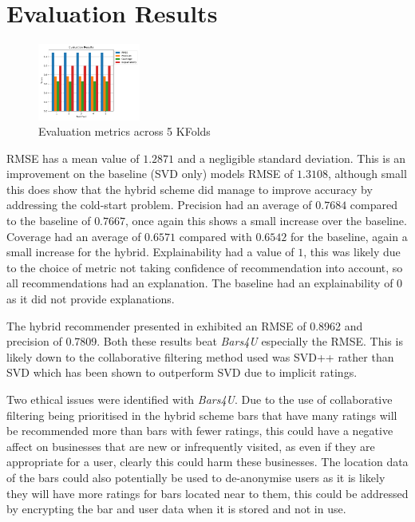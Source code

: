 \documentclass[conference]{IEEEtran}
\begin{document}
\section{Evaluation Results}
\begin{figure}[h]
    \centering
    \includegraphics[width=0.3\textwidth]{result_graph}
    \caption{Evaluation metrics across 5 KFolds}
    \label{fig:res}
\end{figure}
RMSE has a mean value of $1.2871$ and a negligible standard deviation. This is an improvement on the baseline (SVD only) models RMSE of $1.3108$, although small this does show that the hybrid scheme did manage to improve accuracy by addressing the cold-start problem. Precision had an average of $0.7684$ compared to the baseline of $0.7667$, once again this shows a small increase over the baseline. Coverage had an average of $0.6571$ compared with $0.6542$ for the baseline, again a small increase for the hybrid. Explainability had a value of $1$, this was likely due to the choice of metric not taking confidence of recommendation into account, so all recommendations had an explanation. The baseline had an explainability of $0$ as it did not provide explanations.
\par
The hybrid recommender presented in\cite{b15} exhibited an RMSE of 0.8962 and precision of 0.7809. Both these results beat \textit{Bars4U} especially the RMSE. This is likely down to the collaborative filtering method used was SVD++ rather than SVD which has been shown to outperform SVD due to implicit ratings\cite{b15}.
\par
Two ethical issues were identified with \textit{Bars4U}. Due to the use of collaborative filtering being prioritised in the hybrid scheme bars that have many ratings will be recommended more than bars with fewer ratings, this could have a negative affect on businesses that are new or infrequently visited, as even if they are appropriate for a user, clearly this could harm these businesses. The location data of the bars could also potentially be used to de-anonymise users as it is likely they will have more ratings for bars located near to them, this could be addressed by encrypting the bar and user data when it is stored and not in use.
\end{document}
